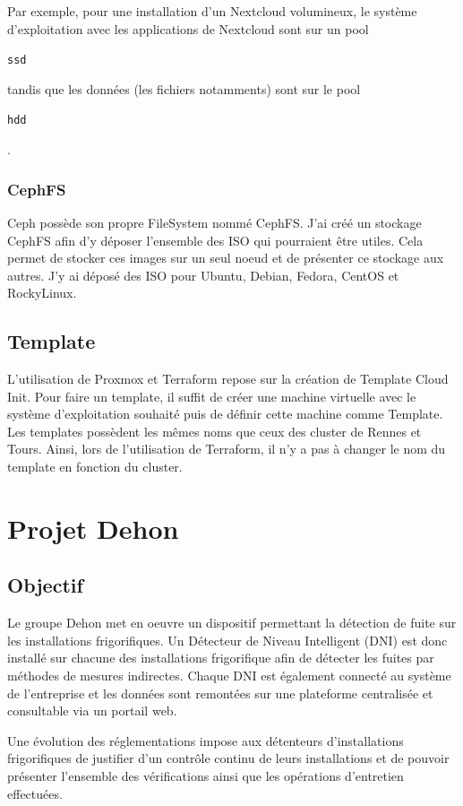 \documentclass[12pt]{article}
\begin{document}
Par exemple, pour une installation d'un \gls{Nextcloud} volumineux, le système d'exploitation avec les applications de \gls{Nextcloud} sont sur un pool \begin{code}\texttt{ssd}\end{code} tandis que les données (les fichiers notamments) sont sur le pool \begin{code}\texttt{hdd}\end{code}.

\subsubsection{CephFS}
\gls{Ceph} possède son propre \gls{FileSystem} nommé CephFS.
J'ai créé un stockage CephFS afin d'y déposer l'ensemble des \gls{ISO} qui pourraient être utiles.
Cela permet de stocker ces images sur un seul noeud et de présenter ce stockage aux autres.
J'y ai déposé des \gls{ISO} pour Ubuntu, Debian, Fedora, CentOS et RockyLinux.

\subsection{Template}
L'utilisation de \gls{Proxmox} et \gls{Terraform} repose sur la création de Template Cloud Init.
Pour faire un template, il suffit de créer une machine virtuelle avec le système d'exploitation souhaité puis de définir cette machine comme Template.
Les templates possèdent les mêmes noms que ceux des \gls{cluster} de Rennes et Tours.
Ainsi, lors de l'utilisation de Terraform, il n'y a pas à changer le nom du template en fonction du cluster.

\newpage
\section{Projet Dehon} \label{dehon}
\subsection{Objectif}
Le groupe Dehon met en oeuvre un dispositif permettant la détection de fuite sur les installations frigorifiques. 
Un Détecteur de Niveau Intelligent (\gls{DNI}) est donc installé sur chacune des installations frigorifique afin de détecter les fuites par méthodes de mesures indirectes.
Chaque DNI est également connecté au système de l'entreprise et les données sont remontées sur une plateforme centralisée et consultable via un portail web. 

Une évolution des réglementations impose aux détenteurs d'installations frigorifiques de justifier d'un contrôle continu de leurs installations et de pouvoir présenter l'ensemble des vérifications ainsi que les opérations d'entretien effectuées.
\end{document}
